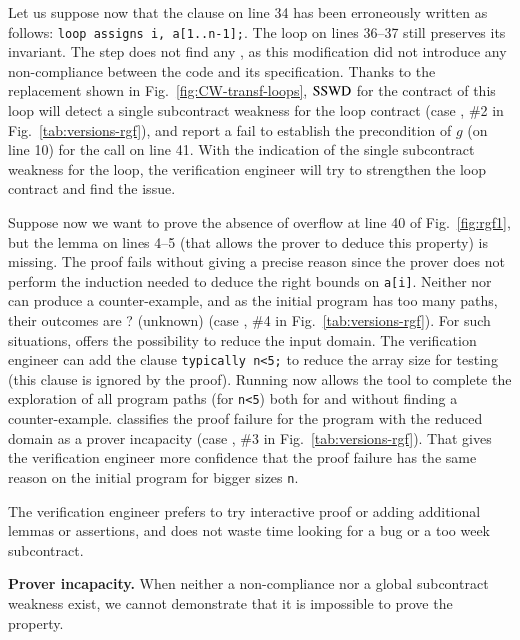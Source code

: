 Let us suppose now that the clause on line 34 has been erroneously
written as follows: \lstinline'loop assigns i, a[1..n-1];'.
The loop on lines 36--37 still preserves its invariant.
The \NCD step does not find any \NCCE, as this modification did not introduce
any non-compliance between the code and its specification.
Thanks to the replacement shown in Fig.~\ref{fig:CW-transf-loops},
$\mathrm{SSWD}$ for the contract of this loop will detect a single
subcontract weakness for the loop contract (case ,
\#2 in Fig.~\ref{tab:versions-rgf}),
and report a fail to establish the 
precondition of $g$ (on line 10) for the call on line 41.
With the indication of the single subcontract weakness for the loop, 
the verification engineer will try to strengthen the loop contract
and find the issue. 



Suppose now we want to prove the absence of overflow at line 40
of Fig.~\ref{fig:rgf1}, but the lemma on lines 4--5 
(that allows the prover to deduce this property) is missing.
The proof fails  without giving a precise reason since
the prover does not perform the induction needed to deduce the right bounds on
\lstinline'a[i]'.
Neither \NCD nor \CWD can produce a counter-example, and
as the initial program has too many paths, their outcomes are \textsf{?}
(unknown) (case , \#4 in Fig.~\ref{tab:versions-rgf}).
For such situations, \stady offers the possibility to reduce the input domain.
The verification engineer can add the \acsl clause 
\lstinline'typically n<5;' to reduce the array size 
for testing (this clause is ignored by the proof). 
Running \stady now allows the tool to complete the exploration of all
program paths (for \lstinline'n<5') both for \NCD and \CWD without finding a counter-example.
\stady classifies the proof failure for the program with 
the reduced domain as a prover incapacity (case ,
\#3 in Fig.~\ref{tab:versions-rgf}).
That gives the verification engineer more confidence that the proof failure
has the same reason on the initial program for bigger sizes \lstinline{n}.

The verification engineer prefers to  try interactive proof or adding additional
lemmas or assertions,
and does not waste time looking for a bug or a too week subcontract.





\textbf{Prover incapacity.}
When neither a non-compliance nor a global subcontract weakness
exist, we cannot demonstrate that it is impossible to prove the property.

